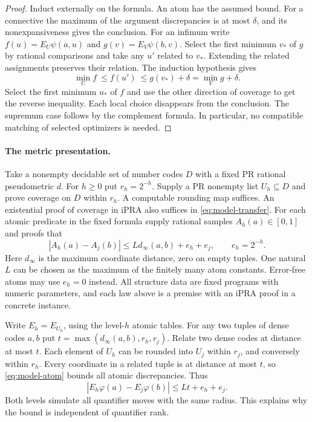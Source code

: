 \begin{proof}
Induct externally on the formula. An atom has the assumed bound. For a
connective the maximum of the argument discrepancies is at most $\delta$,
and its nonexpansiveness gives the conclusion. For an infimum write
$f(u)=E_U\psi(a,u)$ and $g(v)=E_V\psi(b,v)$. Select the first
minimum $v_*$ of $g$ by rational comparisons and take any $u'$ related
to $v_*$. Extending the related assignments preserves their relation.
The induction hypothesis gives
\[
  \min_U f\ \leq f(u')\ \leq g(v_*)+\delta=\min_V g+\delta.
\]
Select the first minimum $u_*$ of $f$ and use the other direction of
coverage to get the reverse inequality. Each local choice disappears from
the conclusion. The supremum case follows by the complement formula.
In particular, no compatible matching of selected optimizers is needed.
\end{proof}

\paragraph{The metric presentation.}
Take a nonempty decidable set of number codes $D$ with a fixed PR rational
pseudometric $d$. For $h\geq0$ put $r_h=2^{-h}$. Supply a PR nonempty list
$U_h\subseteq D$ and prove coverage on $D$ within $r_h$. A computable
rounding map suffices. An existential proof of coverage in iPRA also suffices
in \eqref{eq:model-transfer}. For each atomic predicate in the fixed formula
supply rational samples $A_h(a)\in[0,1]$ and proofs that
\begin{equation}
 |A_h(a)-A_j(b)|\le Ld_\infty(a,b)+e_h+e_j,\qquad e_h=2^{-h}.
 \label{eq:model-atom}
\end{equation}
Here $d_\infty$ is the maximum coordinate distance, zero on empty tuples.
One natural $L$ can be chosen as the maximum of the finitely many atom
constants. Error-free atoms may use $e_h=0$ instead. All structure data are
fixed programs with numeric parameters, and each law above is a premise
with an iPRA proof in a concrete instance.

Write $E_h=E_{U_h}$, using the level-$h$ atomic tables. For any two
tuples of dense codes $a,b$ put $t=\max(d_\infty(a,b),r_h,r_j)$.
Relate two dense codes at distance at most $t$. Each element of $U_h$
can be rounded into $U_j$ within $r_j$, and conversely within $r_h$.
Every coordinate in a related tuple is at distance at most $t$, so
\eqref{eq:model-atom} bounds all atomic discrepancies. Thus
\begin{equation}
 |E_h\varphi(a)-E_j\varphi(b)|\leq Lt+e_h+e_j.
 \label{eq:model-name}
\end{equation}
Both levels simulate all quantifier moves with the same radius. This
explains why the bound is independent of quantifier rank.

